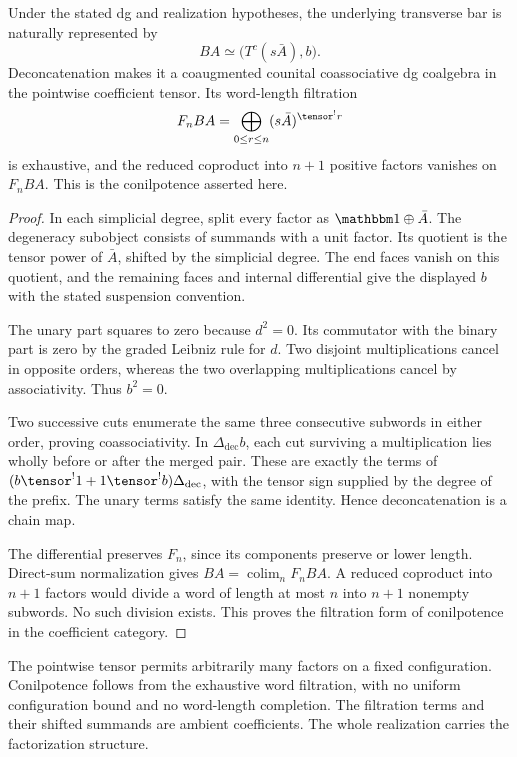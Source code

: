 \begin{theorem}\label{cbc:internal:normalized}
Under the stated dg and realization hypotheses, the underlying transverse bar is naturally represented by
\[
 BA\simeq\bigl(T^c(s\bar A),b\bigr).
\]
Deconcatenation makes it a coaugmented counital coassociative dg coalgebra in the pointwise coefficient tensor. Its word-length filtration
\[
 F_nBA=\bigoplus_{0\leq r\leq n}(s\bar A)^{\tensor^!r}
\]
is exhaustive, and the reduced coproduct into $n+1$ positive factors vanishes on $F_nBA$. This is the conilpotence asserted here.
\end{theorem}
\begin{proof}
In each simplicial degree, split every factor as $\mathbbm1\oplus\bar A$. The degeneracy subobject consists of summands with a unit factor. Its quotient is the tensor power of $\bar A$, shifted by the simplicial degree. The end faces vanish on this quotient, and the remaining faces and internal differential give the displayed $b$ with the stated suspension convention.

The unary part squares to zero because $d^2=0$. Its commutator with the binary part is zero by the graded Leibniz rule for $d$. Two disjoint multiplications cancel in opposite orders, whereas the two overlapping multiplications cancel by associativity. Thus $b^2=0$.

Two successive cuts enumerate the same three consecutive subwords in either order, proving coassociativity. In $\Delta_{\mathrm{dec}}b$, each cut surviving a multiplication lies wholly before or after the merged pair. These are exactly the terms of $(b\tensor^!1+1\tensor^!b)\Delta_{\mathrm{dec}}$, with the tensor sign supplied by the degree of the prefix. The unary terms satisfy the same identity. Hence deconcatenation is a chain map.

The differential preserves $F_n$, since its components preserve or lower length. Direct-sum normalization gives $BA=\operatorname*{colim}_nF_nBA$. A reduced coproduct into $n+1$ factors would divide a word of length at most $n$ into $n+1$ nonempty subwords. No such division exists. This proves the filtration form of conilpotence in the coefficient category.
\end{proof}

The pointwise tensor permits arbitrarily many factors on a fixed configuration. Conilpotence follows from the exhaustive word filtration, with no uniform configuration bound and no word-length completion. The filtration terms and their shifted summands are ambient coefficients. The whole realization carries the factorization structure.

